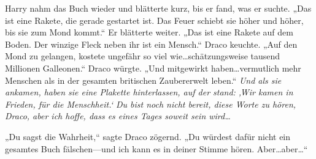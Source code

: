 Harry nahm das Buch wieder und blätterte kurz, bis er fand, was er suchte. „Das ist eine Rakete, die gerade gestartet ist. Das Feuer schiebt sie höher und höher, bis sie zum Mond kommt.“ Er blätterte weiter. „Das ist eine Rakete auf dem Boden. Der winzige Fleck neben ihr ist ein Mensch.“ Draco keuchte. „Auf den Mond zu gelangen, kostete ungefähr so viel wie…schätzungsweise tausend Millionen Galleonen.“ Draco würgte. „Und mitgewirkt haben…vermutlich mehr Menschen als in der gesamten britischen Zaubererwelt leben.“ \emph{Und als sie ankamen, haben sie eine Plakette hinterlassen, auf der stand: ‚Wir kamen in Frieden, für die Menschheit.‘ Du bist noch nicht bereit, diese Worte zu hören, Draco, aber ich hoffe, dass es eines Tages soweit sein wird…}

„Du sagst die Wahrheit,“ sagte Draco zögernd. „Du würdest dafür nicht ein gesamtes Buch fälschen—und ich kann es in deiner Stimme hören. Aber…aber…“

